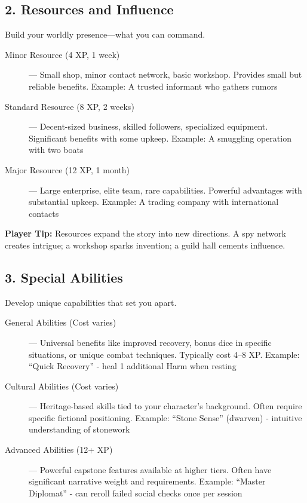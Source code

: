 \documentclass[11pt,twoside,openany]{book}
\begin{document}
\subsection*{2. Resources and Influence}

Build your worldly presence---what you can command.

\begin{description}
\item[Minor Resource (4 XP, 1 week)] --- Small shop, minor contact network, basic workshop. Provides small but reliable benefits. Example: A trusted informant who gathers rumors
\item[Standard Resource (8 XP, 2 weeks)] --- Decent-sized business, skilled followers, specialized equipment. Significant benefits with some upkeep. Example: A smuggling operation with two boats
\item[Major Resource (12 XP, 1 month)] --- Large enterprise, elite team, rare capabilities. Powerful advantages with substantial upkeep. Example: A trading company with international contacts
\end{description}

\textbf{Player Tip:} Resources expand the story into new directions. A spy network creates intrigue; a workshop sparks invention; a guild hall cements influence.

\subsection*{3. Special Abilities}

Develop unique capabilities that set you apart.

\begin{description}
\item[General Abilities (Cost varies)] --- Universal benefits like improved recovery, bonus dice in specific situations, or unique combat techniques. Typically cost 4--8 XP. Example: ``Quick Recovery'' - heal 1 additional Harm when resting
\item[Cultural Abilities (Cost varies)] --- Heritage-based skills tied to your character's background. Often require specific fictional positioning. Example: ``Stone Sense'' (dwarven) - intuitive understanding of stonework
\item[Advanced Abilities (12+ XP)] --- Powerful capstone features available at higher tiers. Often have significant narrative weight and requirements. Example: ``Master Diplomat'' - can reroll failed social checks once per session
\end{description}
\end{document}
